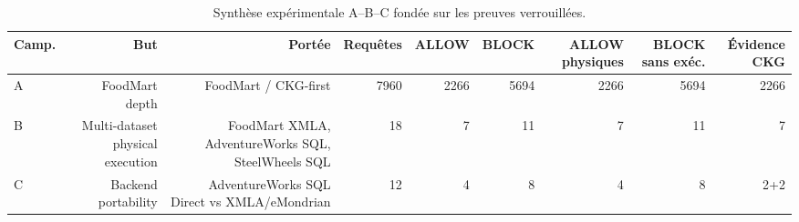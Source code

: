 \begin{table}[!t]
\centering
\caption{Synthèse expérimentale A--B--C fondée sur les preuves verrouillées.}
\scriptsize
\setlength{\tabcolsep}{4pt}
\begin{tabular}{@{}lrrrrrrrr@{}}
\toprule
Camp. & But & Portée & Requêtes & ALLOW & BLOCK & ALLOW physiques & BLOCK sans exéc. & Évidence CKG \\
\midrule
A & FoodMart depth & FoodMart / CKG-first & 7960 & 2266 & 5694 & 2266 & 5694 & 2266 \\
B & Multi-dataset physical execution & FoodMart XMLA, AdventureWorks SQL, SteelWheels SQL & 18 & 7 & 11 & 7 & 11 & 7 \\
C & Backend portability & AdventureWorks SQL Direct vs XMLA/eMondrian & 12 & 4 & 8 & 4 & 8 & 2+2 \\
\bottomrule
\end{tabular}
\normalsize
\label{tab:abc-evidence-synthesis}
\end{table}
